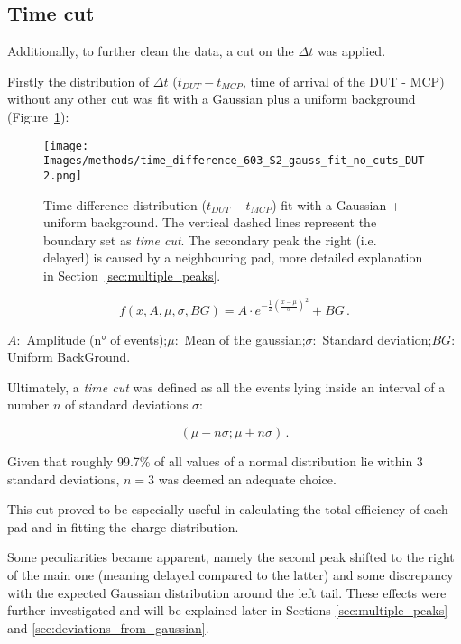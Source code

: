 \subsection{Time cut}\label{subsec:time_cut}

Additionally, to further clean the data, a cut on the \(\Delta t\) was applied.

Firstly the distribution of \(\Delta t\) (\(t_{DUT}-t_{MCP}\), time of arrival of the DUT - MCP) without any other cut was fit with a Gaussian plus a uniform background (Figure~\ref{fig:time_cut_gauss+bg_fit}):

\begin{figure}[h!tbp]
    \centering
    \texttt{[image: Images/methods/time\_difference\_603\_S2\_gauss\_fit\_no\_cuts\_DUT2.png]}
    \captionsetup{width=\captionwidth}
    \caption{Time difference distribution (\(t_{DUT}-t_{MCP}\)) fit with a Gaussian + uniform background. The vertical dashed lines represent the boundary set as \textit{time cut}. The secondary peak 
     the right (i.e. delayed) is caused by a neighbouring pad, more detailed explanation in Section~\ref{sec:multiple_peaks}.}
    \label{fig:time_cut_gauss+bg_fit}
\end{figure}

\begin{equation*}
    f(x,A,\mu,\sigma,BG) = A \cdot e^{-\frac{1}{2}\left(\frac{x-\mu}{\sigma} \right)^2} + BG  \, .
\end{equation*}

\(A:\) Amplitude (n° of events);\quad \(\mu:\) Mean of the gaussian;\quad \(\sigma:\) Standard deviation;\quad \(BG:\) Uniform BackGround.

Ultimately, a \textit{time cut} was defined as all the events lying inside an interval of a number \(n\) of standard deviations \(\sigma\):

\begin{equation}
    (\mu-n\sigma;\mu+n\sigma) \, .
\end{equation}

Given that roughly 99.7\% of all values of a normal distribution lie within 3 standard deviations, \(n=3\) was deemed an adequate choice.

This cut proved to be especially useful in calculating the total efficiency of each pad and in fitting the charge distribution.

Some peculiarities became apparent, namely the second peak shifted to the right of the main one (meaning delayed compared to the latter) and some discrepancy with the expected Gaussian distribution around the left tail. These effects were further investigated and will be explained later in Sections \ref{sec:multiple_peaks} and \ref{sec:deviations_from_gaussian}.

